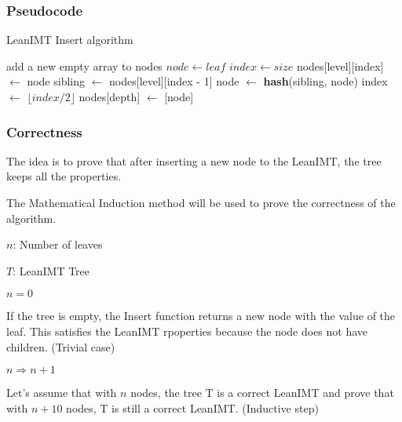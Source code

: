 \documentclass{article}
\begin{document}
\subsubsection{Pseudocode}

\begin{algorithm}[H]
    \caption{LeanIMT Insert algorithm}\label{insert}
    \begin{algorithmic}[1]
         
        \State add a new empty array to nodes 
        \EndIf
        \State $node\gets leaf$
        \State $index\gets size$ 
        \State nodes[level][index] $\gets$ node
         
        \State sibling $\gets$ nodes[level][index - 1]
        \State node $\gets$ \textbf{hash}(sibling, node)
        \EndIf
        \State index $\gets$ $\lfloor index/2 \rfloor$ 
        \EndFor
        \State nodes[depth] $\gets$ [node] 
        \EndProcedure
    \end{algorithmic}
\end{algorithm}



\subsubsection{Correctness}

The idea is to prove that after inserting a new node to the LeanIMT, the tree keeps all the properties.

The Mathematical Induction method will be used to prove the correctness of the algorithm.

$n$: Number of leaves

$T$: LeanIMT Tree

$n=0$

If the tree is empty, the Insert function returns a new node with the value of the leaf. This satisfies the LeanIMT rpoperties because the node does not have children. (Trivial case)

$n \Rightarrow n+1$

Let's assume that with $n$ nodes, the tree T is a correct LeanIMT and prove that with $n+10$ nodes, T is still a correct LeanIMT. (Inductive step)
\end{document}
